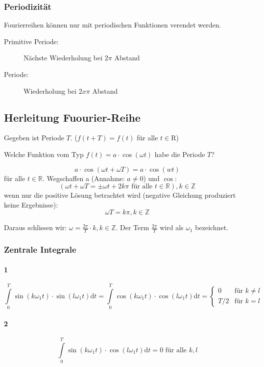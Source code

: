 \subsubsection{Periodizität}

Fourierreihen können nur mit periodischen Funktionen verendet werden.

\begin{description}
	\item[Primitive Periode:] Nächste Wiederholung bei $2\pi$ Abstand
	\item[Periode:] Wiederholung bei $2x\pi$ Abstand
\end{description}

\subsection{Herleitung Fuourier-Reihe}

Gegeben ist Periode $T$. ($f(t+T) = f(t)$ für alle $t \in \mathrm{R}$)

Welche Funktion vom Typ $f(t) = a \cdot \cos(\omega t)$ habe die Periode $T$?

\[
	a \cdot \cos(\omega t + \omega T) = a \cdot \cos(wt)
\]
für alle $t \in \mathbb{R}$. Wegschaffen a (Annahme: $a \neq 0$) und $\cos$:
\[
	(\omega t + \omega T = \pm \omega t + 2k\pi \text{ für alle } t \in \mathbb{R}), k \in \mathbb{Z}
\]
wenn nur die positive Lösung betrachtet wird (negative Gleichung produziert keine Ergebnisse):
\[
	\omega T =  k \pi, k \in \mathbb{Z}
\]

Daraus schlissen wir: $\omega = \frac{2 \pi}{T} \cdot k, k \in \mathbb{Z}$. Der Term $\frac{2 \pi}{T}$ wird als $\omega_1$ bezeichnet.

\subsubsection{Zentrale Integrale}

\paragraph{1}
\[
	\int\limits^T_0 \sin(k \omega_1 t) \cdot \sin(l \omega_1 t) \mathrm{d}t = \int\limits^T_0 \cos(k \omega_1 t) \cdot \cos(l \omega_1 t) \mathrm{d}t = 
	\begin{cases}
	0   & \text{für } k \neq l \\
	T/2 & \text{für } k = l
	\end{cases}
\]

\paragraph{2}
\[
	\int\limits^T_0 \sin(k \omega_1 t) \cdot \cos(l \omega_1 t) \mathrm{d}t = 0 \text{ für alle } k,l
\]

